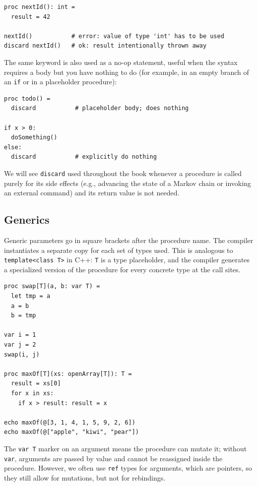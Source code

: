 \documentclass[justified, sixbynine]{tufte-book}
\def\ft{\small\tt}
\theoremstyle{plain}%
\newtheorem * {corollary}{Corollary}
\theoremstyle{definition}
\theoremstyle{remark}
\newtheorem * {remark}{Remark}
\newtheorem * {note}{Note}
\begin{document}
\begin{fullwidth}
\begin{lstlisting}
proc nextId(): int =
  result = 42

nextId()           # error: value of type 'int' has to be used
discard nextId()   # ok: result intentionally thrown away
\end{lstlisting}

The same keyword is also used as a no-op statement, useful when the syntax requires a body but you have nothing to do (for example, in an empty branch of an {\ft if} or in a placeholder procedure):

\begin{lstlisting}
proc todo() =
  discard           # placeholder body; does nothing

if x > 0:
  doSomething()
else:
  discard           # explicitly do nothing
\end{lstlisting}

We will see {\ft discard} used throughout the book whenever a procedure is called purely for its side effects (e.g., advancing the state of a Markov chain or invoking an external command) and its return value is not needed.

\goodbreak\subsection{Generics}


Generic parameters go in square brackets after the procedure name. The compiler instantiates a separate copy for each set of types used. This is analogous to {\ft template<class T>} in C++: {\ft T} is a type placeholder, and the compiler generates a specialized version of the procedure for every concrete type at the call sites.

\begin{lstlisting}
proc swap[T](a, b: var T) =
  let tmp = a
  a = b
  b = tmp

var i = 1
var j = 2
swap(i, j)

proc maxOf[T](xs: openArray[T]): T =
  result = xs[0]
  for x in xs:
    if x > result: result = x

echo maxOf(@[3, 1, 4, 1, 5, 9, 2, 6])
echo maxOf(@["apple", "kiwi", "pear"])
\end{lstlisting}

The {\ft var T} marker on an argument means the procedure can mutate it; without {\ft var}, arguments are passed by value and cannot be reassigned inside the procedure. However, we often use {\ft ref} types for arguments, which are pointers, so they still allow for mutations, but not for rebindings.


\end{fullwidth}
\end{document}
